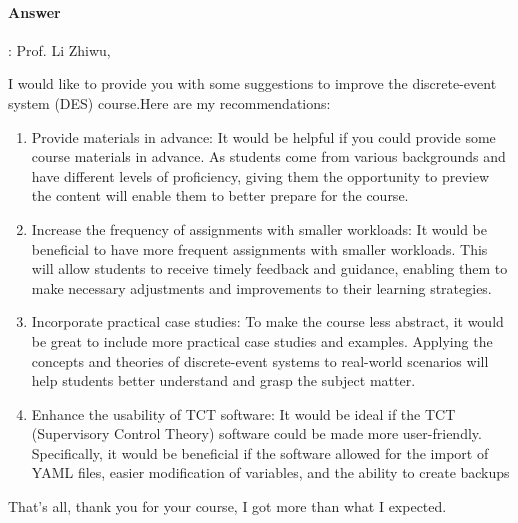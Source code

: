 \documentclass{article}
\begin{document}
\paragraph{Answer}:
Prof. Li Zhiwu,

I would like to provide you with some suggestions to improve the discrete-event system (DES) course.Here are my recommendations:

\begin{enumerate}
  \item Provide materials in advance: It would be helpful if you could provide some course materials in advance. As students come from various backgrounds and have different levels of proficiency, giving them the opportunity to preview the content will enable them to better prepare for the course.

  \item Increase the frequency of assignments with smaller workloads: It would be beneficial to have more frequent assignments with smaller workloads. This will allow students to receive timely feedback and guidance, enabling them to make necessary adjustments and improvements to their learning strategies.

  \item Incorporate practical case studies: To make the course less abstract, it would be great to include more practical case studies and examples. Applying the concepts and theories of discrete-event systems to real-world scenarios will help students better understand and grasp the subject matter.

  \item Enhance the usability of TCT software: It would be ideal if the TCT (Supervisory Control Theory) software could be made more user-friendly. Specifically, it would be beneficial if the software allowed for the import of YAML files, easier modification of variables, and the ability to create backups
\end{enumerate}

That's all, thank you for your course, I got more than what I expected.
\end{document}
